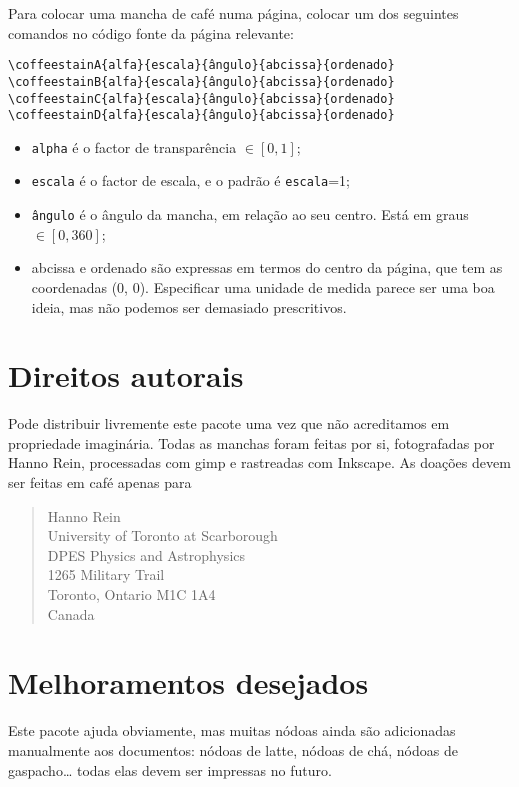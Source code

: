 \documentclass[a4paper, 11pt, BCOR = 0 pt, oneside]{scrartcl}
\begin{document}
Para colocar uma mancha de café numa página, colocar um dos seguintes comandos
no código fonte da página relevante:

\begin{verbatim}
\coffeestainA{alfa}{escala}{ângulo}{abcissa}{ordenado}
\coffeestainB{alfa}{escala}{ângulo}{abcissa}{ordenado}
\coffeestainC{alfa}{escala}{ângulo}{abcissa}{ordenado}
\coffeestainD{alfa}{escala}{ângulo}{abcissa}{ordenado}
\end{verbatim}

\begin{itemize}
\item \texttt{alpha} é o factor de transparência $\in [0,1]$;
\item \texttt{escala} é o factor de escala, e o padrão é \texttt{escala}=1;
\item \texttt{ângulo} é o ângulo da mancha, em relação ao seu centro. Está em graus $\in [0,360]$;
\item abcissa e ordenado são expressas em termos do centro da página, que tem as coordenadas (0, 0). Especificar uma unidade de medida parece ser uma boa ideia, mas não podemos ser demasiado prescritivos.
\end{itemize}


\section{Direitos autorais}
Pode distribuir livremente este pacote uma vez que não acreditamos em
propriedade imaginária. Todas as manchas foram feitas por si, fotografadas por
Hanno Rein, processadas com gimp e rastreadas com Inkscape. As doações devem ser
feitas em café apenas para
\begin{quote}
Hanno Rein\\
University of Toronto at Scarborough\\
DPES Physics and Astrophysics\\
1265 Military Trail\\
Toronto, Ontario M1C 1A4\\
Canada
\end{quote}

\section{Melhoramentos desejados}
Este pacote ajuda obviamente, mas muitas nódoas ainda são adicionadas
manualmente aos documentos: nódoas de latte, nódoas de chá, nódoas de
gaspacho\dots{} todas elas devem ser impressas no futuro.
\end{document}
